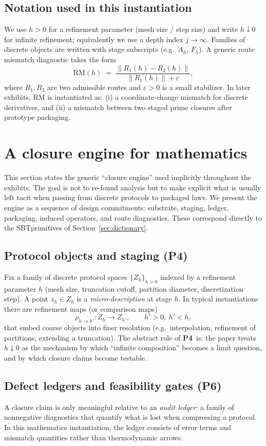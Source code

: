 \documentclass[apajournal,article,submit,moreauthors,pdftex]{Definitions/mdpi}
\newcommand{\SBT}{\textsc{SBT}}
\newcommand{\Pfour}{\textbf{P4}}
\newcommand{\Psix}{\textbf{P6}}
\begin{document}
\subsection{Notation used in this instantiation}
We use $h>0$ for a refinement parameter (mesh size / step size) and write $h\downarrow 0$ for infinite refinement; equivalently we use a depth index $j\to\infty$.
Families of discrete objects are written with stage subscripts (e.g.\ $A_h$, $F_h$).
A generic route mismatch diagnostic takes the form
\[
\mathrm{RM}(h)\;=\;\frac{\|R_1(h)-R_2(h)\|}{\|R_1(h)\|+\varepsilon},
\]
where $R_1,R_2$ are two admissible routes and $\varepsilon>0$ is a small stabilizer.
In later exhibits, $\mathrm{RM}$ is instantiated as: (i) a coordinate-change mismatch for discrete derivatives, and (ii) a mismatch between two staged prime closures after prototype packaging.
 \section{A closure engine for mathematics}
\label{sec:packaging-engine}

This section states the generic ``closure engine'' used implicitly throughout the exhibits.
The goal is not to re-found analysis but to make explicit what is usually left tacit when passing from discrete protocols to packaged laws.
We present the engine as a sequence of design commitments: substrate, staging, ledger, packaging, induced operators, and route diagnostics.
These correspond directly to the \SBT primitives of Section~\ref{sec:dictionary}.

\subsection{Protocol objects and staging (\Pfour)}
Fix a family of discrete protocol spaces $\{Z_h\}_{h>0}$ indexed by a refinement parameter $h$ (mesh size, truncation cutoff, partition diameter, discretization step).
A point $z_h\in Z_h$ is a \emph{micro-description} at stage $h$.
In typical instantiations there are refinement maps (or comparison maps)
\[
\rho_{h\to h'}:Z_h \to Z_{h'}, \qquad h'>0,\ h'<h,
\]
that embed coarse objects into finer resolution (e.g.\ interpolation, refinement of partitions, extending a truncation).
The abstract role of \Pfour\ is: the paper treats $h\downarrow 0$ as the mechanism by which ``infinite composition'' becomes a limit question, and by which closure claims become testable.

\subsection{Defect ledgers and feasibility gates (\Psix)}
A closure claim is only meaningful relative to an \emph{audit ledger}:
a family of nonnegative diagnostics that quantify what is lost when compressing a protocol.
In this mathematics instantiation, the ledger consists of error terms and mismatch quantities rather than thermodynamic arrows.
\end{document}
